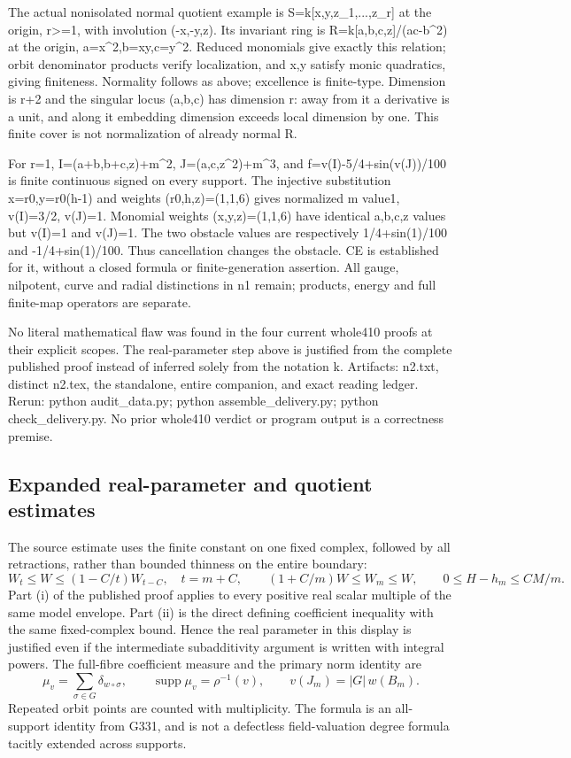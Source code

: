The actual nonisolated normal quotient example is S=k[x,y,z\_1,...,z\_r] at the origin, r\textgreater{}=1, with involution (-x,-y,z). Its invariant ring is R=k[a,b,c,z]/(ac-b\textasciicircum{}2) at the origin, a=x\textasciicircum{}2,b=xy,c=y\textasciicircum{}2. Reduced monomials give exactly this relation; orbit denominator products verify localization, and x,y satisfy monic quadratics, giving finiteness. Normality follows as above; excellence is finite-type. Dimension is r+2 and the singular locus (a,b,c) has dimension r: away from it a derivative is a unit, and along it embedding dimension exceeds local dimension by one. This finite cover is not normalization of already normal R.

For r=1, I=(a+b,b+c,z)+m\textasciicircum{}2, J=(a,c,z\textasciicircum{}2)+m\textasciicircum{}3, and f=v(I)-5/4+sin(v(J))/100 is finite continuous signed on every support. The injective substitution x=r0,y=r0(h-1) and weights (r0,h,z)=(1,1,6) gives normalized m value1, v(I)=3/2, v(J)=1. Monomial weights (x,y,z)=(1,1,6) have identical a,b,c,z values but v(I)=1 and v(J)=1. The two obstacle values are respectively 1/4+sin(1)/100 and -1/4+sin(1)/100. Thus cancellation changes the obstacle. CE is established for it, without a closed formula or finite-generation assertion. All gauge, nilpotent, curve and radial distinctions in n1 remain; products, energy and full finite-map operators are separate.

No literal mathematical flaw was found in the four current whole410 proofs at their explicit scopes. The real-parameter step above is justified from the complete published proof instead of inferred solely from the notation k. Artifacts: n2.txt, distinct n2.tex, the standalone, entire companion, and exact reading ledger. Rerun: python audit\_data.py; python assemble\_delivery.py; python check\_delivery.py. No prior whole410 verdict or program output is a correctness premise.

\subsection*{Expanded real-parameter and quotient estimates}
The source estimate uses the finite constant on one fixed complex, followed
by all retractions, rather than bounded thinness on the entire boundary:
\[
 W_t\le W\le(1-C/t)W_{t-C},\quad t=m+C,
 \qquad (1+C/m)W\le W_m\le W,
 \qquad 0\le H-h_m\le CM/m.
\]
Part (i) of the published proof applies to every positive real scalar
multiple of the same model envelope. Part (ii) is the direct defining
coefficient inequality with the same fixed-complex bound. Hence the real
parameter in this display is justified even if the intermediate
subadditivity argument is written with integral powers.
The full-fibre coefficient measure and the primary norm identity are
\[
 \mu_v=\sum_{\sigma\in G}\delta_{w\circ\sigma},\qquad
 \operatorname{supp}\mu_v=\rho^{-1}(v),\qquad
 v(J_m)=|G|\,w(B_m).
\]
Repeated orbit points are counted with multiplicity. The formula is an
all-support identity from G331, and is not a defectless field-valuation
degree formula tacitly extended across supports.


